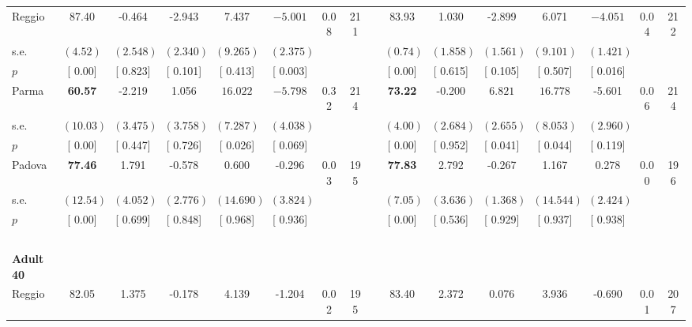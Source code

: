 \begin{longtable}{L{8em} c c c c c c c p{1em} c c c c c c c}
\quad \quad \quad Reggio& 87.40 &    -0.464 &    -2.943 &     7.437 & $ \mathbf{   -5.001}$ &      0.08 &       211 & & 83.93 &     1.030 &    -2.899 &     6.071 & $ \mathbf{   -4.051}$ &      0.04 &       212  \\*
\quad \quad \quad \quad s.e.& $ (     4.52)$ & $ (    2.548)$ & $ (    2.340)$ & $ (    9.265)$ & $ (    2.375)$ & & & & $ (     0.74)$ & $ (    1.858)$ & $ (    1.561)$ & $ (    9.101)$ & $ (    1.421)$ & &  \\*
\quad \quad \quad \quad $ p$ & [     0.00] & [    0.823] & [    0.101] & [    0.413] & [    0.003] & & & & [     0.00] & [    0.615] & [    0.105] & [    0.507] & [    0.016] & &  \\[1em]
\quad \quad \quad Parma& \textbf{    60.57} &    -2.219 &     1.056 & $ \mathbf{   16.022}$ & $ \mathbf{   -5.798}$ &      0.32 &       214 & & \textbf{    73.22} &    -0.200 & $ \mathbf{    6.821}$ & $ \mathbf{   16.778}$ &    -5.601 &      0.06 &       214  \\*
\quad \quad \quad \quad s.e.& $ (    10.03)$ & $ (    3.475)$ & $ (    3.758)$ & $ (    7.287)$ & $ (    4.038)$ & & & & $ (     4.00)$ & $ (    2.684)$ & $ (    2.655)$ & $ (    8.053)$ & $ (    2.960)$ & &  \\*
\quad \quad \quad \quad $ p$ & [     0.00] & [    0.447] & [    0.726] & [    0.026] & [    0.069] & & & & [     0.00] & [    0.952] & [    0.041] & [    0.044] & [    0.119] & &  \\[1em]
\quad \quad \quad Padova& \textbf{    77.46} &     1.791 &    -0.578 &     0.600 &    -0.296 &      0.03 &       195 & & \textbf{    77.83} &     2.792 &    -0.267 &     1.167 &     0.278 &      0.00 &       196  \\*
\quad \quad \quad \quad s.e.& $ (    12.54)$ & $ (    4.052)$ & $ (    2.776)$ & $ (   14.690)$ & $ (    3.824)$ & & & & $ (     7.05)$ & $ (    3.636)$ & $ (    1.368)$ & $ (   14.544)$ & $ (    2.424)$ & &  \\*
\quad \quad \quad \quad $ p$ & [     0.00] & [    0.699] & [    0.848] & [    0.968] & [    0.936] & & & & [     0.00] & [    0.536] & [    0.929] & [    0.937] & [    0.938] & &  \\[1em]
~\\[1em]
\quad \quad \textbf{Adult 40} & & & & & & & & & & & & & & & \\* 
\quad \quad \quad Reggio& 82.05 &     1.375 &    -0.178 &     4.139 &    -1.204 &      0.02 &       195 & & 83.40 &     2.372 &     0.076 &     3.936 &    -0.690 &      0.01 &       207  \\*

\end{longtable}
